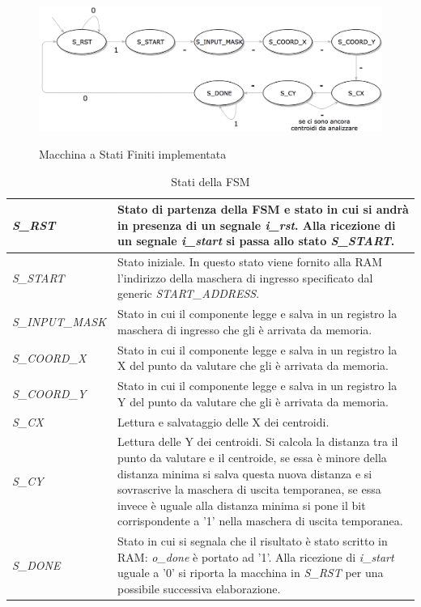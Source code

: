 \documentclass{article}
\begin{document}
\begin{figure}[H]
    \centering
    \caption{Macchina a Stati Finiti implementata}
    \includegraphics[width=1.0\textwidth]{images/FSM.png}
    \label{fig:FSM}
\end{figure}

\setlength\intextsep{0mm}
\begin{table}[H]
    \centering
    \caption{Stati della FSM}
    \begin{tabu} to 1.0\textwidth { | X[1] | X[4.0] | }
        \hline
        \textit{S\_RST} & Stato di partenza della FSM e stato in cui si andrà in presenza di un segnale \textit{i\_rst}. Alla ricezione di un segnale \textit{i\_start} si passa allo stato \textit{S\_START}.\\
        \hline
        \textit{S\_START} & Stato iniziale. In questo stato viene fornito alla RAM l'indirizzo della maschera di ingresso specificato dal generic \textit{START\_ADDRESS}. \\
        \hline
        \textit{S\_INPUT\_MASK} & Stato in cui il componente legge e salva in un registro la maschera di ingresso che gli è arrivata da memoria. \\
        \hline
        \textit{S\_COORD\_X} & Stato in cui il componente legge e salva in un registro la X del punto da valutare che gli è arrivata da memoria. \\
        \hline
        \textit{S\_COORD\_Y} & Stato in cui il componente legge e salva in un registro la Y del punto da valutare che gli è arrivata da memoria. \\
        \hline
        \textit{S\_CX} & Lettura e salvataggio delle X dei centroidi. \\
        \hline
        \textit{S\_CY} & Lettura delle Y dei centroidi. Si calcola la distanza tra il punto da valutare e il centroide, se essa è minore della distanza minima si salva questa nuova distanza e si sovrascrive la maschera di uscita temporanea, se essa invece è uguale alla distanza minima si pone il bit corrispondente a '1' nella maschera di uscita temporanea. \\
        \hline
        \textit{S\_DONE} & Stato in cui si segnala che il risultato è stato scritto in RAM: \textit{o\_done} è portato ad '1'. Alla ricezione di \textit{i\_start} uguale a '0' si riporta la macchina in \textit{S\_RST} per una possibile successiva elaborazione. \\
        \hline
    \end{tabu}
    \label{tab:FSM}
\end{table}
\end{document}
